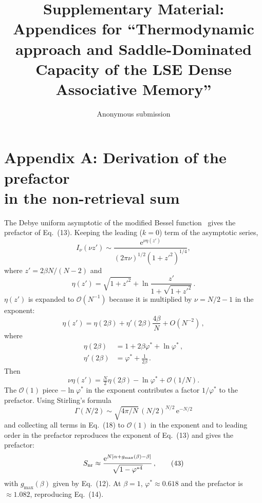 \documentclass[letterpaper]{article} %
\title{\bfseries Supplementary Material:\\Appendices for ``Thermodynamic approach and Saddle-Dominated Capacity of the LSE Dense Associative Memory''}
\author{Anonymous submission}
\newcommand{\e}{{\mathrm{e}}}
\newcommand{\Bnet}{\beta}
\begin{document}
\maketitle

\appendix

\section{Appendix A: Derivation of the prefactor \\in the non-retrieval sum}

The Debye uniform asymptotic of the modified Bessel function~\citep[10.41.3]{olver2010nist}
gives the prefactor of Eq.~(13). Keeping the leading ($k = 0$) term of
the asymptotic series,
\begin{equation}
I_\nu(\nu z') \sim \frac{\e^{\nu\eta(z')}}{(2\pi\nu)^{1/2}(1+{z'}^2)^{1/4}},
\tag{36}
\end{equation}
where $z' = 2\Bnet N/(N-2)$ and
\begin{equation}
    \eta(z') = \sqrt{1+{z'}^2} + \ln\frac{z'}{1+\sqrt{1+{z'}^2}}\,.
    \tag{37}
    \label{eq:bessel_debye}
\end{equation}
$\eta(z')$ is expanded to $\mathcal{O}(N^{-1})$ because it is multiplied by
$\nu = N/2 - 1$ in the exponent:
\begin{equation}
    \eta(z') = \eta(2\Bnet) + \eta'(2\Bnet) \frac{4\Bnet}{N} + O(N^{-2})\,,
    \tag{38}
\end{equation}
where
\begin{align}
    \eta(2\Bnet)  &= 1 + 2\Bnet\varphi^* + \ln\varphi^*\,, \tag{39}\\
    \eta'(2\Bnet) &= \varphi^* + \frac{1}{2\Bnet}\,. \tag{40}
\end{align}
Then
\begin{equation}
    \nu \eta(z') = \tfrac{N}{2} \eta(2\Bnet) - \ln\varphi^* + \mathcal{O}(1/N).
    \tag{41}
\end{equation}
The $\mathcal{O}(1)$ piece $-\ln\varphi^*$ in the exponent contributes a factor
$1/\varphi^*$ to the prefactor. Using Stirling's formula
\begin{equation}
    \Gamma(N/2) \sim \sqrt{4\pi/N}\,(N/2)^{N/2}\,\e^{-N/2}
    \tag{42}
\end{equation}
and collecting all terms in Eq.~(18) to $\mathcal{O}(1)$ in the
exponent and to leading order in the prefactor reproduces the exponent
of Eq.~(13) and gives the prefactor:
\begin{equation}
S_{\rm nr} \approx \frac{\e^{N[\alpha + g_{\max}(\Bnet) - \Bnet]}}{\sqrt{1-\varphi^{*4}}}\,,
\tag{43}
\end{equation}
with $g_{\max}(\Bnet)$ given by Eq.~(12).
At $\Bnet = 1$, $\varphi^* \approx 0.618$ and the prefactor is $\approx 1.082$, reproducing Eq.~(14).
\end{document}
